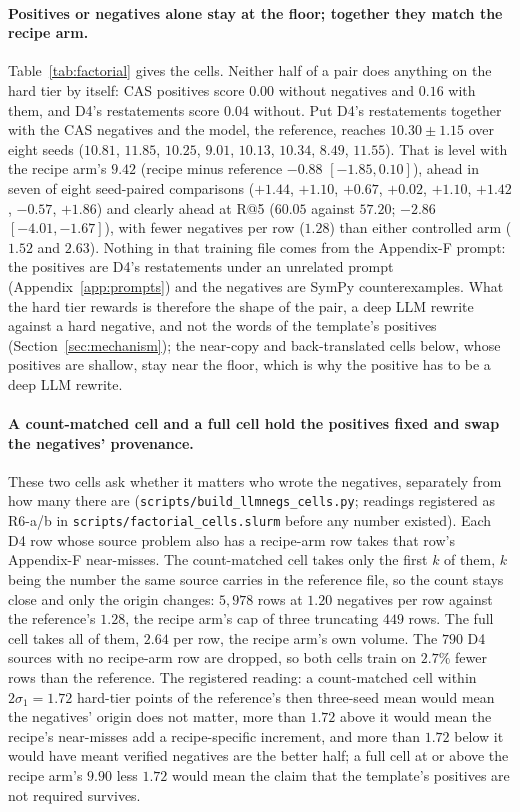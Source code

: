 

\paragraph{Positives or negatives alone stay at the floor; together they match the recipe arm.}
Table~\ref{tab:factorial} gives the cells. Neither half of a pair does anything on the hard tier by itself: CAS positives score $0.00$ without negatives and $0.16$ with them, and D4's restatements score $0.04$ without. Put D4's restatements together with the CAS negatives and the model, the reference, reaches $10.30 \pm 1.15$ over eight seeds ($10.81$, $11.85$, $10.25$, $9.01$, $10.13$, $10.34$, $8.49$, $11.55$). That is level with the recipe arm's $9.42$ (recipe minus reference $-0.88$ $[-1.85, 0.10]$), ahead in seven of eight seed-paired comparisons ($+1.44$, $+1.10$, $+0.67$, $+0.02$, $+1.10$, $+1.42$, $-0.57$, $+1.86$) and clearly ahead at R@5 ($60.05$ against $57.20$; $-2.86$ $[-4.01, -1.67]$), with fewer negatives per row ($1.28$) than either controlled arm ($1.52$ and $2.63$). Nothing in that training file comes from the Appendix-F prompt: the positives are D4's restatements under an unrelated prompt (Appendix~\ref{app:prompts}) and the negatives are SymPy counterexamples. What the hard tier rewards is therefore the shape of the pair, a deep LLM rewrite against a hard negative, and not the words of the template's positives (Section~\ref{sec:mechanism}); the near-copy and back-translated cells below, whose positives are shallow, stay near the floor, which is why the positive has to be a deep LLM rewrite.

\paragraph{A count-matched cell and a full cell hold the positives fixed and swap the negatives' provenance.}
These two cells ask whether it matters who wrote the negatives, separately from how many there are (\texttt{scripts/build\_llmnegs\_cells.py}; readings registered as R6-a/b in \texttt{scripts/factorial\_cells.slurm} before any number existed). Each D4 row whose source problem also has a recipe-arm row takes that row's Appendix-F near-misses. The count-matched cell takes only the first $k$ of them, $k$ being the number the same source carries in the reference file, so the count stays close and only the origin changes: $5{,}978$ rows at $1.20$ negatives per row against the reference's $1.28$, the recipe arm's cap of three truncating $449$ rows. The full cell takes all of them, $2.64$ per row, the recipe arm's own volume. The $790$ D4 sources with no recipe-arm row are dropped, so both cells train on $2.7\%$ fewer rows than the reference. The registered reading: a count-matched cell within $2\sigma_1 = 1.72$ hard-tier points of the reference's then three-seed mean would mean the negatives' origin does not matter, more than $1.72$ above it would mean the recipe's near-misses add a recipe-specific increment, and more than $1.72$ below it would have meant verified negatives are the better half; a full cell at or above the recipe arm's $9.90$ less $1.72$ would mean the claim that the template's positives are not required survives.

